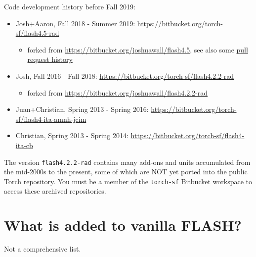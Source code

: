\documentclass[10pt]{article}
\begin{document}
Code development history before Fall 2019:
\begin{itemize}
    \item Josh+Aaron, Fall 2018 - Summer 2019: \url{https://bitbucket.org/torch-sf/flash4.5-rad}
        \begin{itemize}
            \item forked from \url{https://bitbucket.org/joshuawall/flash4.5},
                see also some \href{https://bitbucket.org/joshuawall/flash4.5/pull-requests/?state=MERGED}{pull request history}
        \end{itemize}
    \item Josh, Fall 2016 - Fall 2018: \url{https://bitbucket.org/torch-sf/flash4.2.2-rad}
        \begin{itemize}
            \item forked from \url{https://bitbucket.org/joshuawall/flash4.2.2-rad}
        \end{itemize}
    \item Juan+Christian, Spring 2013 - Spring 2016: \url{https://bitbucket.org/torch-sf/flash4-ita-amnh-jcim}
    \item Christian, Spring 2013 - Spring 2014: \url{https://bitbucket.org/torch-sf/flash4-ita-cb}
\end{itemize}
The version \texttt{flash4.2.2-rad} contains many add-ons and units accumulated
from the mid-2000s to the present, some of which are NOT yet ported into the
public Torch repository.
You must be a member of the \texttt{torch-sf} Bitbucket workspace to access
these archived repositories.


\section{What is added to vanilla FLASH?}

Not a comprehensive list.
\end{document}
